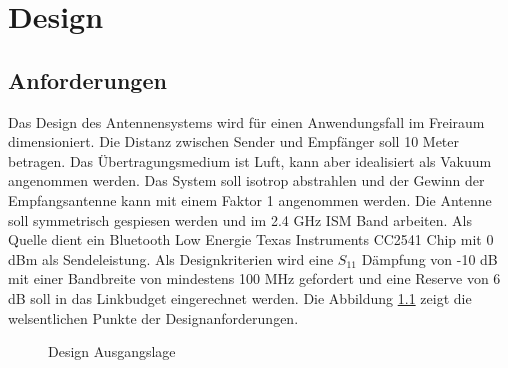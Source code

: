 \newpage 
\chapter{Design}

\section{Anforderungen}
Das Design des Antennensystems wird für einen Anwendungsfall im Freiraum dimensioniert. Die Distanz zwischen Sender und Empfänger soll 10 Meter betragen. Das Übertragungsmedium ist Luft, kann aber idealisiert als Vakuum angenommen werden. Das System soll isotrop abstrahlen und der Gewinn der Empfangsantenne kann mit einem Faktor  1 angenommen werden. Die Antenne soll symmetrisch gespiesen werden und im 2.4 GHz ISM Band arbeiten. Als Quelle dient ein Bluetooth Low Energie Texas Instruments CC2541 Chip mit 0 dBm als Sendeleistung. Als Designkriterien wird eine $S_{11}$ Dämpfung von -10 dB mit einer Bandbreite von mindestens 100 MHz gefordert und eine Reserve von 6 dB soll in das Linkbudget eingerechnet werden. Die Abbildung \ref{fig:DesignAusgangslage} zeigt die welsentlichen Punkte der Designanforderungen.

\begin{figure}[!ht]
\begin{center}
\end{center}
\caption{Design Ausgangslage}
\label{fig:DesignAusgangslage}
\end{figure}

